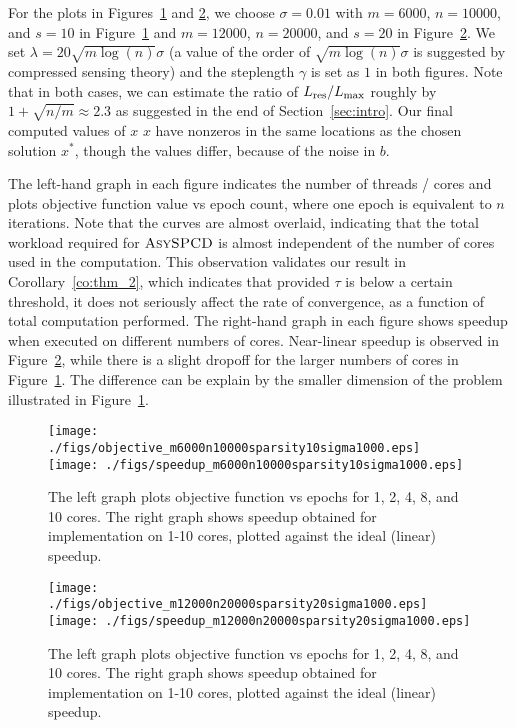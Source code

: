 \documentclass{siamltex}
\begin{document}
For the plots in Figures~\ref{fig:LASSO_1} and \ref{fig:LASSO_2}, we
choose $\sigma = 0.01$ with $m=6000$, $n=10000$, and $s=10$ in
Figure~\ref{fig:LASSO_1} and $m=12000$, $n=20000$, and $s=20$ in
Figure~\ref{fig:LASSO_2}. We set $\lambda = 20\sqrt{m\log (n)}\sigma$
(a value of the order of $\sqrt{m\log (n)}\sigma$ is suggested by
compressed sensing theory) and the steplength $\gamma$ is set as $1$
in both figures. Note that in both cases, we can estimate the ratio of
${L_{\mbox{\rm\scriptsize res}}}/{L_{\mbox{\rm\scriptsize max}}}$ roughly by $1+\sqrt{n/m} \approx 2.3$ as suggested in
the end of Section~\ref{sec:intro}.  Our final computed values of $x$
$x$ have nonzeros in the same locations as the chosen solution $x^*$,
though the values differ, because of the noise in $b$.

The left-hand graph in each figure indicates the number of threads /
cores and plots objective function value vs epoch count, where one
epoch is equivalent to $n$ iterations. {} Note that the
curves are almost overlaid, indicating that the total workload
required for ${\mbox{\sc AsySPCD}}$ is almost independent of the number of cores
used in the computation. This observation validates our result in
Corollary~\ref{co:thm_2}, which indicates that provided $\tau$ is
below a certain threshold, it does not seriously affect the rate of
convergence, as a function of total computation performed.  The
right-hand graph in each figure shows speedup when executed on
different numbers of cores. Near-linear speedup is observed in
Figure~\ref{fig:LASSO_2}, while there is a slight dropoff for the
larger numbers of cores in Figure~\ref{fig:LASSO_1}. The difference
can be explain by the smaller dimension of the problem illustrated in
Figure~\ref{fig:LASSO_1}.

\begin{figure}[htp]
  \centering
 \texttt{[image: ./figs/objective\_m6000n10000sparsity10sigma1000.eps]} \;\;
 \texttt{[image: ./figs/speedup\_m6000n10000sparsity10sigma1000.eps]}
\caption{The left graph plots objective function vs epochs for 1, 2,
  4, 8, and 10 cores. The right graph shows speedup obtained for
  implementation on 1-10 cores, plotted against the ideal (linear)
  speedup.}
\label{fig:LASSO_1}
\end{figure}

\begin{figure}[htp]
  \centering
 \texttt{[image: ./figs/objective\_m12000n20000sparsity20sigma1000.eps]} \;\;
 \texttt{[image: ./figs/speedup\_m12000n20000sparsity20sigma1000.eps]}
\caption{The left graph plots objective function vs epochs for 1, 2,
  4, 8, and 10 cores. The right graph shows speedup obtained for
  implementation on 1-10 cores, plotted against the ideal (linear)
  speedup.}
\label{fig:LASSO_2}
\end{figure}
\end{document}
